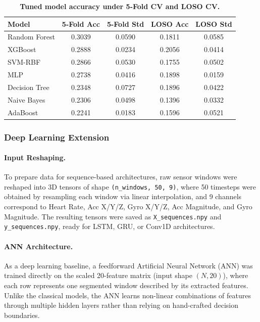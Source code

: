 \documentclass[12pt,a4paper]{cibb}
\begin{document}
\begin{table}[H]
\centering
\small
\caption{\textbf{Tuned model accuracy under 5-Fold CV and LOSO CV.}\label{tab:model_results}}
\begin{tabular}{lcccc}
\toprule
\textbf{Model} & \textbf{5-Fold Acc} & \textbf{5-Fold Std} & \textbf{LOSO Acc} & \textbf{LOSO Std} \\
\midrule
\rowcolor{LightBlue} Random Forest & 0.3039 & 0.0590 & 0.1811 & 0.0585 \\
XGBoost       & 0.2888 & 0.0234 & 0.2056 & 0.0414 \\
\rowcolor{LightBlue} SVM-RBF       & 0.2866 & 0.0530 & 0.1755 & 0.0502 \\
MLP           & 0.2738 & 0.0416 & 0.1898 & 0.0159 \\
\rowcolor{LightBlue} Decision Tree & 0.2348 & 0.0727 & 0.1896 & 0.0422 \\
Naive Bayes   & 0.2306 & 0.0498 & 0.1396 & 0.0332 \\
\rowcolor{LightBlue} AdaBoost      & 0.2241 & 0.0183 & 0.1596 & 0.0521 \\
\bottomrule
\end{tabular}
\end{table}

\subsubsection{Deep Learning Extension}

\paragraph{Input Reshaping.} To prepare data for sequence-based architectures, raw sensor windows were reshaped into 3D tensors of shape \texttt{(n\_windows, 50, 9)}, where 50 timesteps were obtained by resampling each window via linear interpolation, and 9 channels correspond to Heart Rate, Acc X/Y/Z, Gyro X/Y/Z, Acc Magnitude, and Gyro Magnitude. The resulting tensors were saved as \texttt{X\_sequences.npy} and \texttt{y\_sequences.npy}, ready for LSTM, GRU, or Conv1D architectures.

\paragraph{ANN Architecture.} As a deep learning baseline, a feedforward Artificial Neural Network (ANN) was trained directly on the scaled 20-feature matrix (input shape $(N, 20)$), where each row represents one segmented window described by its extracted features. Unlike the classical models, the ANN learns non-linear combinations of features through multiple hidden layers rather than relying on hand-crafted decision boundaries.
\end{document}
